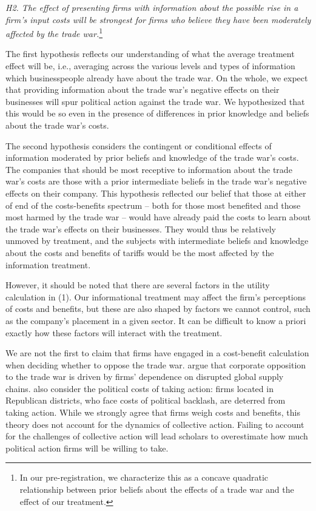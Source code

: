 \documentclass{article}
\begin{document}
\textit{H2. The effect of presenting firms with information about the possible rise in a firm's input costs will be strongest for firms who believe they have been moderately affected by the trade war.}\footnote{In our pre-registration, we characterize this as a concave quadratic relationship between prior beliefs about the effects of a trade war and the effect of our treatment.}

The first hypothesis reflects our understanding of what the average treatment effect will be, i.e., averaging across the various levels and types of information which businesspeople already have about the trade war. On the whole, we expect that providing information about the trade war's negative effects on their businesses will spur political action against the trade war. We hypothesized that this would be so even in the presence of differences in prior knowledge and beliefs about the trade war's costs.

The second hypothesis considers the contingent or conditional effects of information moderated by prior beliefs and knowledge of the trade war's costs. The companies that should be most receptive to information about the trade war's costs are those with a prior intermediate beliefs in the trade war's negative effects on their company. This hypothesis reflected our belief that those at either of end of the costs-benefits spectrum -- both for those most benefited and those most harmed by the trade war -- would have already paid the costs to learn about the trade war's effects on their businesses. They would thus be relatively unmoved by treatment, and the subjects with intermediate beliefs and knowledge about the costs and benefits of tariffs would be the most affected by the information treatment.

However, it should be noted that there are several factors in the utility calculation in (1). Our informational treatment may affect the firm's perceptions of costs and benefits, but these are also shaped by factors we cannot control, such as the company's placement in a given sector. It can be difficult to know a priori exactly how these factors will interact with the treatment.

We are not the first to claim that firms have engaged in a cost-benefit calculation when deciding whether to oppose the trade war. \citet{lee2021firms} argue that corporate opposition to the trade war is driven by firms' dependence on disrupted global supply chains. \citet{zhu2021firms} also consider the political costs of taking action: firms located in Republican districts, who face costs of political backlash, are deterred from taking action. While we strongly agree that firms weigh costs and benefits, this theory does not account for the dynamics of collective action. Failing to account for the challenges of collective action will lead scholars to overestimate how much political action firms will be willing to take.
\end{document}
